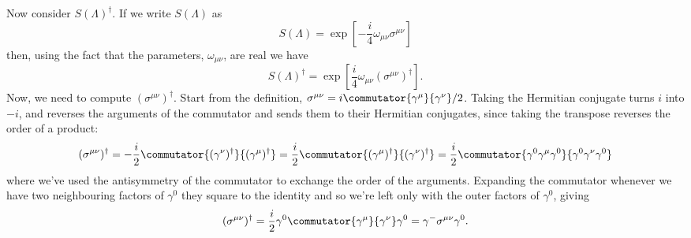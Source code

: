 \documentclass[fleqn]{NotesClass}
\newcommand{\hermit}{{\dagger}}
\begin{document}
    Now consider \(S(\Lambda)^\hermit\).
    If we write \(S(\Lambda)\) as
    \begin{equation}
        S(\Lambda) = \exp\left[ -\frac{i}{4} \omega_{\mu\nu} \sigma^{\mu\nu} \right]
    \end{equation}
    then, using the fact that the parameters, \(\omega_{\mu\nu}\), are real we have
    \begin{equation}
        S(\Lambda)^\hermit = \exp\left[ \frac{i}{4}\omega_{\mu\nu} (\sigma^{\mu\nu})^{\hermit} \right].
    \end{equation}
    Now, we need to compute \((\sigma^{\mu\nu})^\hermit\).
    Start from the definition, \(\sigma^{\mu\nu} = i\commutator{\gamma^\mu}{\gamma^\nu}/2\).
    Taking the Hermitian conjugate turns \(i\) into \(-i\), and reverses the arguments of the commutator and sends them to their Hermitian conjugates, since taking the transpose reverses the order of a product:
    \begin{equation}
        (\sigma^{\mu\nu})^{\hermit} = -\frac{i}{2}\commutator{(\gamma^\nu)^\hermit}{(\gamma^\mu)^\hermit} = \frac{i}{2}\commutator{(\gamma^\mu)^{\hermit}}{(\gamma^\nu)^{\hermit}} = \frac{i}{2}\commutator{\gamma^0\gamma^\mu\gamma^0}{\gamma^0\gamma^\nu\gamma^0}
    \end{equation}
    where we've used the antisymmetry of the commutator to exchange the order of the arguments.
    Expanding the commutator whenever we have two neighbouring factors of \(\gamma^0\) they square to the identity and so we're left only with the outer factors of \(\gamma^0\), giving
    \begin{equation}
        (\sigma^{\mu\nu})^\hermit = \frac{i}{2}\gamma^0 \commutator{\gamma^\mu}{\gamma^\nu} \gamma^0 = \gamma^- \sigma^{\mu\nu} \gamma^0.
    \end{equation}
    
\end{document}
